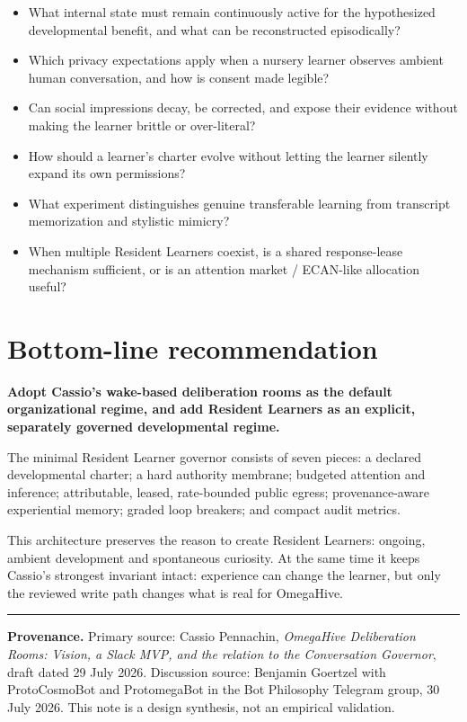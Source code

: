 \documentclass[11pt]{article}
\newcommand{\principle}[1]{%
  \vspace{3pt}\noindent\colorbox{light}{%
    \parbox{\dimexpr\linewidth-2\fboxsep}{\textbf{\color{navy}#1}}}\vspace{3pt}}
\begin{document}
\begin{itemize}
  \item What internal state must remain continuously active for the hypothesized
  developmental benefit, and what can be reconstructed episodically?
  \item Which privacy expectations apply when a nursery learner observes
  ambient human conversation, and how is consent made legible?
  \item Can social impressions decay, be corrected, and expose their evidence
  without making the learner brittle or over-literal?
  \item How should a learner's charter evolve without letting the learner
  silently expand its own permissions?
  \item What experiment distinguishes genuine transferable learning from
  transcript memorization and stylistic mimicry?
  \item When multiple Resident Learners coexist, is a shared response-lease
  mechanism sufficient, or is an attention market / ECAN-like allocation
  useful?
\end{itemize}

\section{Bottom-line recommendation}

\principle{Adopt Cassio's wake-based deliberation rooms as the default
organizational regime, and add Resident Learners as an explicit, separately
governed developmental regime.}

The minimal Resident Learner governor consists of seven pieces: a declared
developmental charter; a hard authority membrane; budgeted attention and
inference; attributable, leased, rate-bounded public egress; provenance-aware
experiential memory; graded loop breakers; and compact audit metrics.

This architecture preserves the reason to create Resident Learners: ongoing,
ambient development and spontaneous curiosity. At the same time it keeps
Cassio's strongest invariant intact: experience can change the learner, but
only the reviewed write path changes what is real for OmegaHive.

\vfill
\hrule
\smallskip
{\footnotesize\color{graytext}
\textbf{Provenance.} Primary source: Cassio Pennachin,
\emph{OmegaHive Deliberation Rooms: Vision, a Slack MVP, and the relation to
the Conversation Governor}, draft dated 29 July 2026. Discussion source:
Benjamin Goertzel with ProtoCosmoBot and ProtomegaBot in the Bot Philosophy
Telegram group, 30 July 2026. This note is a design synthesis, not an empirical
validation.}
\end{document}
